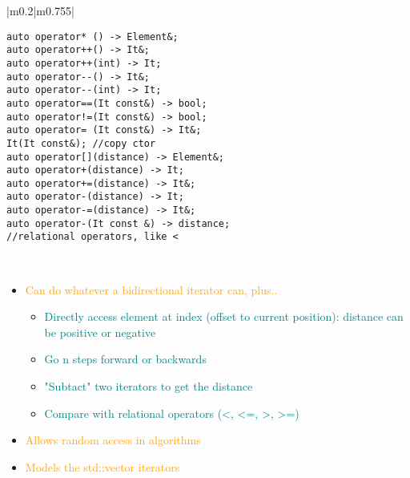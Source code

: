 \documentclass[main.tex,fontsize=8pt,paper=a4,paper=portrait,DIV=calc,]{scrartcl}
\begin{document}
\begin{table}[ht!]
\begin{tabular}{|m{0.2\linewidth}|m{0.755\linewidth}|}
\begin{lstlisting}
auto operator* () -> Element&;
auto operator++() -> It&;
auto operator++(int) -> It;
auto operator--() -> It&;
auto operator--(int) -> It;
auto operator==(It const&) -> bool;
auto operator!=(It const&) -> bool;
auto operator= (It const&) -> It&;
It(It const&); //copy ctor
auto operator[](distance) -> Element&;
auto operator+(distance) -> It;
auto operator+=(distance) -> It&;
auto operator-(distance) -> It;
auto operator-=(distance) -> It&;
auto operator-(It const &) -> distance;
//relational operators, like <
\end{lstlisting}
\, \newline
\begin{itemize}
\item \textcolor{orange}{Can do whatever a bidirectional iterator can, plus..}\newline
  \begin{itemize}
  \item \textcolor{teal}{Directly access element at index (offset to current position): distance can be positive or negative}
  \item \textcolor{teal}{Go n steps forward or backwards}
  \item \textcolor{teal}{"Subtact" two iterators to get the distance}
  \item \textcolor{teal}{Compare with relational operators (<, <=, >, >=)}
  \end{itemize} 
\item \textcolor{orange}{Allows random access in algorithms}
\item \textcolor{orange}{Models the std::vector iterators}
\vspace{-2mm}
\end{itemize} \\
\hline
\end{tabular}
\end{table}
\pagebreak
\end{document}
